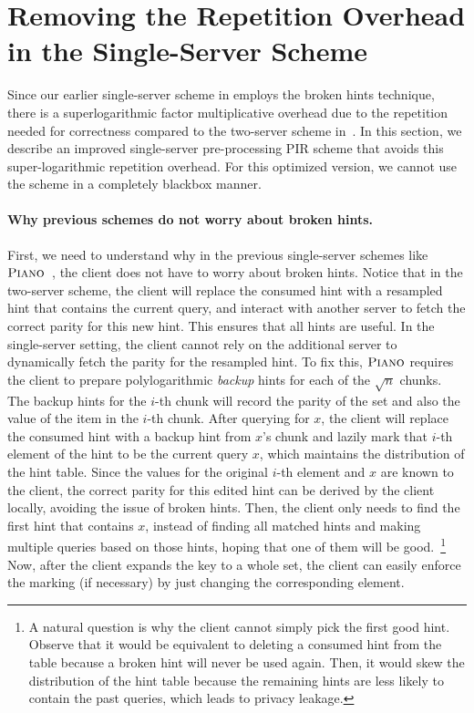 \section{Removing the Repetition Overhead in the Single-Server Scheme}
\label{sec:optimized}

Since our earlier single-server scheme in 
employs the broken hints technique, 
there is a superlogarithmic factor multiplicative overhead
due to the repetition needed for correctness compared to the two-server scheme in~.
In this section, we
describe an improved single-server pre-processing PIR
scheme that avoids this super-logarithmic repetition 
overhead. 
For this optimized version, we cannot use the \ppps scheme
in a completely blackbox manner. 






\paragraph{Why previous schemes do not worry about broken hints.} First, we need
to understand why in the previous single-server schemes like $\textsc{Piano}$~\cite{piano}, the client
does not have to worry about broken hints. 
Notice that in the two-server scheme, the client will replace the consumed hint with a resampled hint that contains the current query, and interact with another server to fetch the correct parity for this new hint.
This ensures that all hints are useful.
In the single-server setting, the client cannot rely on the additional server to dynamically fetch the parity for the resampled hint.
To fix this, $\textsc{Piano}$ requires the client to prepare polylogarithmic \textit{backup} hints for each of the $\sqrt{n}$
chunks.  
The backup hints for the $i$-th chunk will record the parity of the set
and also the value of the item in the $i$-th chunk. After querying for $x$, the
client will replace the consumed hint with a backup hint from $x$'s chunk and
lazily mark that $i$-th element of the hint to be the current query $x$, which
maintains the distribution of the hint table. Since the values for the original
$i$-th element and $x$ are known to the client, the correct parity for this
edited hint can be derived by the client locally, avoiding the issue of broken hints. Then, the client only needs to find the first hint that contains $x$,
instead of finding all matched hints and making multiple queries based on those
hints, hoping that one of them will be good.~\footnote{A natural question is why
the client cannot simply pick the first good hint. Observe that it would be
equivalent to deleting a consumed hint from the table because a broken hint will
never be used again. Then, it would skew the distribution of the hint table
because the remaining hints are  less likely to contain the past queries, which
leads to privacy leakage.}
Now, after the client expands the key to a whole set, the client can easily enforce the marking (if necessary) by just changing the corresponding element.

